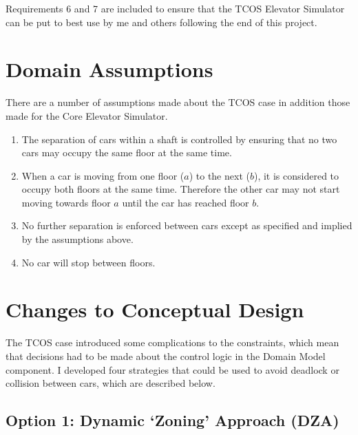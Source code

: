 \documentclass{UoYCSproject}
\begin{document}
Requirements 6 and 7 are included to ensure that the TCOS Elevator Simulator can be put to best use by me and others following the end of this project.

\section{Domain Assumptions}

There are a number of assumptions made about the TCOS case in addition those made for the Core Elevator Simulator.
	\begin{enumerate}
		\item The separation of cars within a shaft is controlled by ensuring that no two cars may occupy the same floor at the same time.
		\item When a car is moving from one floor ($a$) to the next ($b$), it is considered to occupy both floors at the same time.  Therefore the other car may not start moving towards floor $a$ until the car has reached floor $b$.
		\item No further separation is enforced between cars except as specified and implied by the assumptions above.
		\item No car will stop between floors.
	\end{enumerate}

\section{Changes to Conceptual Design}

The TCOS case introduced some complications to the constraints, which mean that decisions had to be made about the control logic in the Domain Model component.  I developed four strategies that could be used to avoid deadlock or collision between cars, which are described below.

\subsection{Option 1: Dynamic `Zoning' Approach (DZA)}
\end{document}
